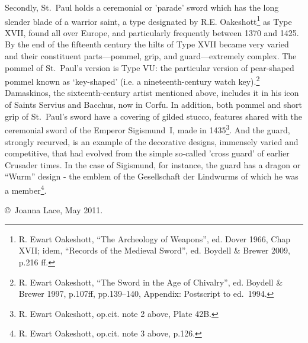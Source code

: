 \documentclass[a4paper,12pt]{article}
\begin{document}
Secondly, St.~Paul holds a ceremonial or 'parade' sword which has the
long slender blade of a warrior saint, a type designated by
R.E. Oakeshott\footnote{R. Ewart Oakeshott, ``The Archeology of
  Weapons'', ed. Dover 1966, Chap XVII; idem, ``Records of the
  Medieval Sword'', ed. Boydell \& Brewer 2009, p.216 ff.} as Type
XVII, found all over Europe, and particularly frequently between 1370
and 1425.  By the end of the fifteenth century the hilts of Type XVII
became very varied and their constituent parts---pommel, grip, and
guard---extremely complex.  The pommel of St.~Paul's version is Type
VU: the particular version of pear-shaped pommel known as `key-shaped'
(i.e. a nineteenth-century watch key).\footnote{R. Ewart Oakeshott,
  ``The Sword in the Age of Chivalry'', ed. Boydell \& Brewer 1997,
  p.107ff, pp.139--140, Appendix: Postscript to ed.~1994.}
Damaskinos, the sixteenth-century artist mentioned above, includes it
in his icon of Saints Servius and Bacchus, now in Corfu. In addition,
both pommel and short grip of St.~Paul's sword have a covering of
gilded stucco, features shared with the ceremonial sword of the
Emperor Sigismund~I, made in 1435\footnote{R. Ewart Oakeshott,
op.cit. note 2 above, Plate 42B.}.  And the guard, strongly
recurved, is an example of the decorative designs, immensely varied
and competitive, that had evolved from the simple so-called 'cross
guard' of earlier Crusader times.  In the case of Sigismund, for
instance, the guard has a dragon or ``Wurm'' design - the emblem of
the Gesellschaft der Lindwurms of which he was a
member\footnote{R. Ewart Oakeshott, op.cit. note 3 above, p.126.}.

\bigskip
\noindent
\copyright\ Joanna Lace, May 2011.
\end{document}
